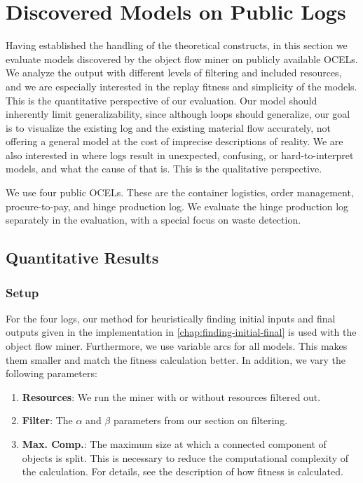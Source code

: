 \section{Discovered Models on Public Logs}
\label{chap:eval-quality}



Having established the handling of the theoretical constructs, in this section we evaluate models discovered by the object flow miner on publicly available OCELs.
We analyze the output with different levels of filtering and included resources, and we are especially interested in the replay fitness and simplicity of the models.
This is the quantitative perspective of our evaluation.
Our model should inherently limit generalizability, since although loops should generalize, our goal is to visualize the existing log and the existing material flow accurately, not offering a general model at the cost of imprecise descriptions of reality.
We are also interested in where logs result in unexpected, confusing, or hard-to-interpret models, and what the cause of that is.
This is the qualitative perspective.



We use four public OCELs.
These are the container logistics, order management, procure-to-pay, and hinge production log.
We evaluate the hinge production log separately in the evaluation, with a special focus on waste detection.






\subsection{Quantitative Results}



\subsubsection{Setup}


For the four logs, our method for heuristically finding initial inputs and final outputs given in the implementation in \cref{chap:finding-initial-final} is used with the object flow miner.
Furthermore, we use variable arcs for all models.
This makes them smaller and match the fitness calculation better.
In addition, we vary the following parameters:
\begin{enumerate}
    \item 
    \textbf{Resources}: We run the miner with or without resources filtered out.

    \item
    \textbf{Filter}: The $\alpha$ and $\beta$ parameters from our section on filtering.

    \item 
    \textbf{Max. Comp.}: The maximum size at which a connected component of objects is split. This is necessary to reduce the computational complexity of the calculation. For details, see the description of how fitness is calculated.
\end{enumerate}


